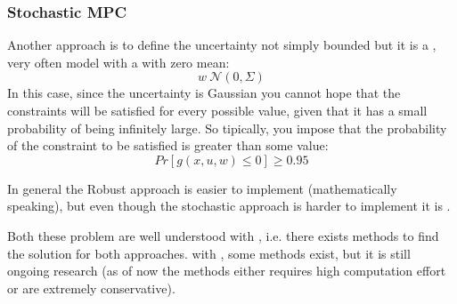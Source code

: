 \subsubsection{Stochastic MPC}
Another approach is to define the uncertainty not simply bounded but it is a , very often model with a  with zero mean:
\[w ~ \mathcal{N}(0,\Sigma)\]
In this case, since the uncertainty is Gaussian you cannot hope that the constraints will be satisfied for every possible value, given that it has a small probability of being infinitely large. So tipically, you impose that the probability of the constraint to be satisfied is greater than some value:
\[Pr[g(x,u,w)\le0] \ge 0.95\]


In general the Robust approach is easier to implement (mathematically speaking), but even though the stochastic approach is harder to implement it is .

Both these problem are well understood with , i.e. there exists methods to find the solution for both approaches. with , some methods exist, but it is still ongoing research (as of now the methods either requires high computation effort or are extremely conservative).
